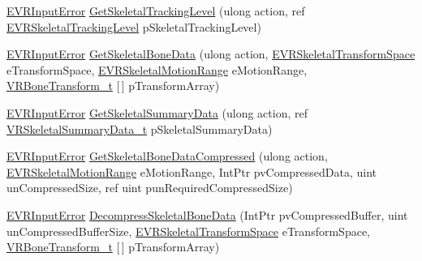 \begin{DoxyCompactItemize}
\item 
\mbox{\hyperlink{namespace_valve_1_1_v_r_a592d7f4189b8346d6c96dbdbaa35bc1b}{E\+V\+R\+Input\+Error}} \mbox{\hyperlink{class_valve_1_1_v_r_1_1_c_v_r_input_a068d729d5cc82bed9bfec96d925911c3}{Get\+Skeletal\+Tracking\+Level}} (ulong action, ref \mbox{\hyperlink{namespace_valve_1_1_v_r_a6f46bd50fb65255d6537ab32a6bddc30}{E\+V\+R\+Skeletal\+Tracking\+Level}} p\+Skeletal\+Tracking\+Level)
\item 
\mbox{\hyperlink{namespace_valve_1_1_v_r_a592d7f4189b8346d6c96dbdbaa35bc1b}{E\+V\+R\+Input\+Error}} \mbox{\hyperlink{class_valve_1_1_v_r_1_1_c_v_r_input_a9f1c4b139b9b4936734dde7806b112d4}{Get\+Skeletal\+Bone\+Data}} (ulong action, \mbox{\hyperlink{namespace_valve_1_1_v_r_a916744fb3fc7b8e8ba224fba9bee6de4}{E\+V\+R\+Skeletal\+Transform\+Space}} e\+Transform\+Space, \mbox{\hyperlink{namespace_valve_1_1_v_r_affc8d18345f8f5d36f1ae7b4ce534500}{E\+V\+R\+Skeletal\+Motion\+Range}} e\+Motion\+Range, \mbox{\hyperlink{struct_valve_1_1_v_r_1_1_v_r_bone_transform__t}{V\+R\+Bone\+Transform\+\_\+t}} \mbox{[}$\,$\mbox{]} p\+Transform\+Array)
\item 
\mbox{\hyperlink{namespace_valve_1_1_v_r_a592d7f4189b8346d6c96dbdbaa35bc1b}{E\+V\+R\+Input\+Error}} \mbox{\hyperlink{class_valve_1_1_v_r_1_1_c_v_r_input_abbcdcd1fae78cc5c1964624222f3239e}{Get\+Skeletal\+Summary\+Data}} (ulong action, ref \mbox{\hyperlink{struct_valve_1_1_v_r_1_1_v_r_skeletal_summary_data__t}{V\+R\+Skeletal\+Summary\+Data\+\_\+t}} p\+Skeletal\+Summary\+Data)
\item 
\mbox{\hyperlink{namespace_valve_1_1_v_r_a592d7f4189b8346d6c96dbdbaa35bc1b}{E\+V\+R\+Input\+Error}} \mbox{\hyperlink{class_valve_1_1_v_r_1_1_c_v_r_input_a1cf34cb3404a64c3ee90959add5add32}{Get\+Skeletal\+Bone\+Data\+Compressed}} (ulong action, \mbox{\hyperlink{namespace_valve_1_1_v_r_affc8d18345f8f5d36f1ae7b4ce534500}{E\+V\+R\+Skeletal\+Motion\+Range}} e\+Motion\+Range, Int\+Ptr pv\+Compressed\+Data, uint un\+Compressed\+Size, ref uint pun\+Required\+Compressed\+Size)
\item 
\mbox{\hyperlink{namespace_valve_1_1_v_r_a592d7f4189b8346d6c96dbdbaa35bc1b}{E\+V\+R\+Input\+Error}} \mbox{\hyperlink{class_valve_1_1_v_r_1_1_c_v_r_input_a25ce602e817281368b2d79d089c4a16f}{Decompress\+Skeletal\+Bone\+Data}} (Int\+Ptr pv\+Compressed\+Buffer, uint un\+Compressed\+Buffer\+Size, \mbox{\hyperlink{namespace_valve_1_1_v_r_a916744fb3fc7b8e8ba224fba9bee6de4}{E\+V\+R\+Skeletal\+Transform\+Space}} e\+Transform\+Space, \mbox{\hyperlink{struct_valve_1_1_v_r_1_1_v_r_bone_transform__t}{V\+R\+Bone\+Transform\+\_\+t}} \mbox{[}$\,$\mbox{]} p\+Transform\+Array)

\end{DoxyCompactItemize}
